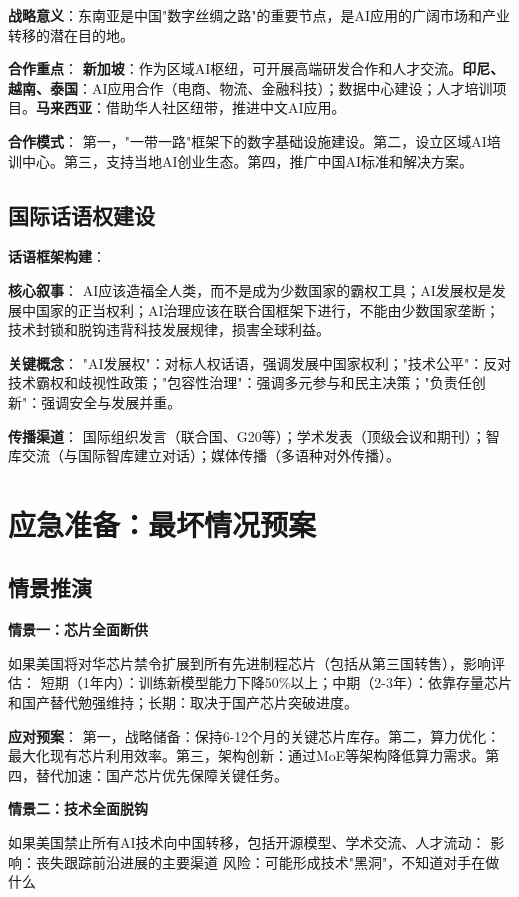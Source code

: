 \textbf{战略意义}：东南亚是中国"数字丝绸之路"的重要节点，是AI应用的广阔市场和产业转移的潜在目的地。

\textbf{合作重点}：
\textbf{新加坡}：作为区域AI枢纽，可开展高端研发合作和人才交流。\textbf{印尼、越南、泰国}：AI应用合作（电商、物流、金融科技）；数据中心建设；人才培训项目。\textbf{马来西亚}：借助华人社区纽带，推进中文AI应用。

\textbf{合作模式}：
第一，"一带一路"框架下的数字基础设施建设。第二，设立区域AI培训中心。第三，支持当地AI创业生态。第四，推广中国AI标准和解决方案。

\subsection{国际话语权建设}

\textbf{话语框架构建}：

\textbf{核心叙事}：
AI应该造福全人类，而不是成为少数国家的霸权工具；AI发展权是发展中国家的正当权利；AI治理应该在联合国框架下进行，不能由少数国家垄断；技术封锁和脱钩违背科技发展规律，损害全球利益。

\textbf{关键概念}：
"AI发展权"：对标人权话语，强调发展中国家权利；"技术公平"：反对技术霸权和歧视性政策；"包容性治理"：强调多元参与和民主决策；"负责任创新"：强调安全与发展并重。

\textbf{传播渠道}：
国际组织发言（联合国、G20等）；学术发表（顶级会议和期刊）；智库交流（与国际智库建立对话）；媒体传播（多语种对外传播）。

\section{应急准备：最坏情况预案}

\subsection{情景推演}

\textbf{情景一：芯片全面断供}

如果美国将对华芯片禁令扩展到所有先进制程芯片（包括从第三国转售），影响评估：
短期（1年内）：训练新模型能力下降50\%以上；中期（2-3年）：依靠存量芯片和国产替代勉强维持；长期：取决于国产芯片突破进度。

\textbf{应对预案}：
第一，战略储备：保持6-12个月的关键芯片库存。第二，算力优化：最大化现有芯片利用效率。第三，架构创新：通过MoE等架构降低算力需求。第四，替代加速：国产芯片优先保障关键任务。

\textbf{情景二：技术全面脱钩}

如果美国禁止所有AI技术向中国转移，包括开源模型、学术交流、人才流动：
影响：丧失跟踪前沿进展的主要渠道 风险：可能形成技术"黑洞"，不知道对手在做什么

